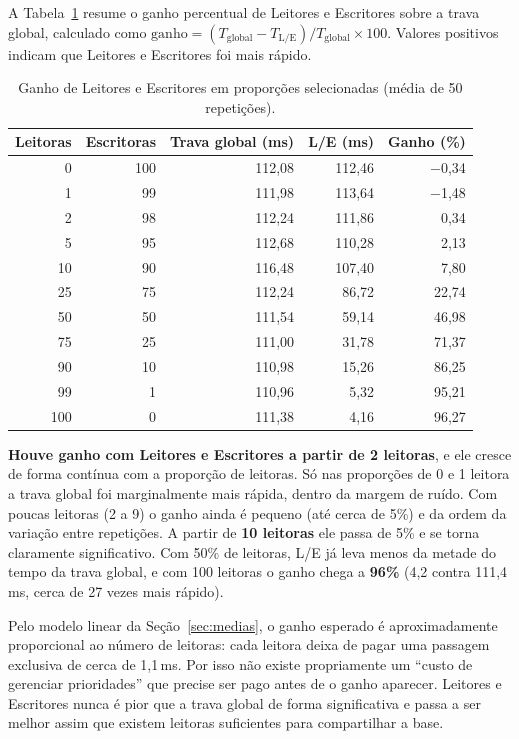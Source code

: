 \documentclass[11pt, a4paper]{article}
\begin{document}
A Tabela~\ref{tab:resumo} resume o ganho percentual de Leitores e Escritores sobre a trava
global, calculado como
$\text{ganho} = (T_{\text{global}} - T_{\text{L/E}}) / T_{\text{global}} \times 100$.
Valores positivos indicam que Leitores e Escritores foi mais rápido.

\begin{table}[H]
    \centering
    \caption{Ganho de Leitores e Escritores em proporções selecionadas (média de 50 repetições).}
    \label{tab:resumo}
    \begin{tabular}{rrrrr}
        \toprule
        Leitoras & Escritoras & Trava global (ms) & L/E (ms) & Ganho (\%) \\
        \midrule
          0 & 100 & 112,08 & 112,46 & $-$0,34 \\
          1 &  99 & 111,98 & 113,64 & $-$1,48 \\
          2 &  98 & 112,24 & 111,86 &    0,34 \\
          5 &  95 & 112,68 & 110,28 &    2,13 \\
         10 &  90 & 116,48 & 107,40 &    7,80 \\
         25 &  75 & 112,24 &  86,72 &   22,74 \\
         50 &  50 & 111,54 &  59,14 &   46,98 \\
         75 &  25 & 111,00 &  31,78 &   71,37 \\
         90 &  10 & 110,98 &  15,26 &   86,25 \\
         99 &   1 & 110,96 &   5,32 &   95,21 \\
        100 &   0 & 111,38 &   4,16 &   96,27 \\
        \bottomrule
    \end{tabular}
\end{table}

\textbf{Houve ganho com Leitores e Escritores a partir de 2 leitoras}, e ele cresce de forma
contínua com a proporção de leitoras. Só nas proporções de 0 e 1 leitora a trava global foi
marginalmente mais rápida, dentro da margem de ruído. Com poucas leitoras (2 a 9) o ganho
ainda é pequeno (até cerca de 5\%) e da ordem da variação entre repetições. A partir de
\textbf{10 leitoras} ele passa de 5\% e se torna claramente significativo. Com 50\% de
leitoras, L/E já leva menos da metade do tempo da trava global, e com 100 leitoras o ganho
chega a \textbf{96\%} (4,2 contra 111,4\,ms, cerca de 27 vezes mais rápido).

Pelo modelo linear da Seção~\ref{sec:medias}, o ganho esperado é aproximadamente proporcional
ao número de leitoras: cada leitora deixa de pagar uma passagem exclusiva de cerca de 1,1\,ms.
Por isso não existe propriamente um ``custo de gerenciar prioridades'' que precise ser pago
antes de o ganho aparecer. Leitores e Escritores nunca é pior que a trava global de forma
significativa e passa a ser melhor assim que existem leitoras suficientes para compartilhar a
base.
\end{document}
